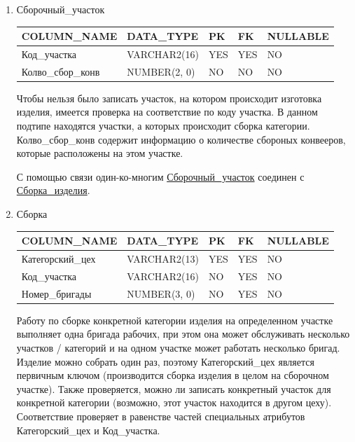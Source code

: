 \begin{enumerate}
    \item{Сборочный\_участок}

    \begin{tabular}{|p{7cm}|p{3cm}|p{1cm}|p{1cm}|p{3cm}|} \hline

        {\bf COLUMN\_NAME} & {\bf DATA\_TYPE} & {\bf PK} & {\bf FK} & {\bf NULLABLE} \\ \hline
        Код\_участка & VARCHAR2(16) & YES & YES & NO \\ \hline
        Колво\_сбор\_конв & NUMBER(2, 0) & NO & NO & NO \\ \hline

    \end{tabular}

    Чтобы нельзя было записать участок, на котором происходит изготовка изделия, имеется проверка на соответствие по коду участка.
    В данном подтипе находятся участки, а которых происходит сборка категории.
    Колво\_сбор\_конв содержит информацию о количестве сбороных конвееров, которые расположены на этом участке.

    С помощью связи один-ко-многим \underline{Сборочный\_участок} соединен с \underline{Сборка\_изделия}.

    \item{Сборка}

    \begin{tabular}{|p{7cm}|p{3cm}|p{1cm}|p{1cm}|p{3cm}|} \hline

        {\bf COLUMN\_NAME} & {\bf DATA\_TYPE} & {\bf PK} & {\bf FK} & {\bf NULLABLE} \\ \hline
        Категорский\_цех & VARCHAR2(13) & YES & YES & NO \\ \hline
        Код\_участка & VARCHAR2(16) & NO & YES & NO \\ \hline
        Номер\_бригады & NUMBER(3, 0) & NO & YES & NO \\ \hline

    \end{tabular}

    Работу по сборке конкретной категории изделия на определенном участке выполняет одна бригада рабочих, при этом она может обслуживать несколько участков / категорий и на одном участке может работать несколько бригад.
    Изделие можно собрать один раз, поэтому Категорский\_цех является первичным ключом (производится сборка изделия в целом на сборочном участке).
    Также проверяется, можно ли записать конкретный участок  для конкретной категории (возможно, этот участок находится в другом цеху).
    Соответствие проверяет в равенстве частей специальных атрибутов Категорский\_цех и Код\_участка.


\end{enumerate}
